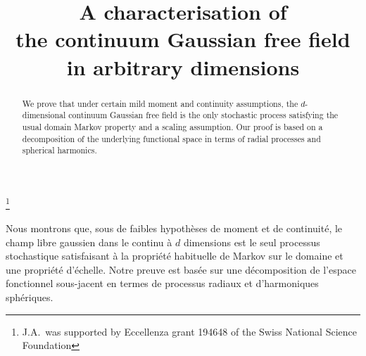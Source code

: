 \documentclass[JEP,XML,SOM,Unicode,published]{cedram}
\theoremstyle{definition}
\begin{document}
\frontmatter
\title[A characterisation of the continuum Gaussian free field in arbitrary dimensions]{A characterisation of\\ the continuum Gaussian free field\\ in arbitrary dimensions}

\author[\initial{J.} \lastname{Aru}]{ }
\address{Institute of Mathematics, École Polytechnique Fédérale de Lausanne\\
CH-1015 Lausanne, Switzerland}

\author[\initial{E.} \lastname{Powell}]{ }
\address{Department of Mathematical and Computing Sciences, Durham University\\
Upper Mountjoy Campus, Stockton Rd, Durham DH1 3LE, UK}

\thanks{J.A.\ was supported by Eccellenza grant 194648 of the Swiss National Science Foundation}

\begin{abstract}
We prove that under certain mild moment and continuity assumptions, the $d$\nobreakdash-dimensional continuum Gaussian free field is the only stochastic process satisfying the usual domain Markov property and a scaling assumption. Our proof is based on a decomposition of the underlying functional space in terms of radial processes and spherical harmonics.
\end{abstract}





\begin{altabstract}
Nous montrons que, sous de faibles hypothèses de moment et de continuité, le champ libre gaussien dans le continu à $d$ dimensions est le seul processus stochastique satisfaisant à la propriété habituelle de Markov sur le domaine et une propriété d'échelle. Notre preuve est basée sur une décomposition de l'espace fonctionnel sous-jacent en termes de processus radiaux et d'harmoniques sphériques.
\end{altabstract}
\maketitle
\vspace*{-\baselineskip}
\tableofcontents
\mainmatter
\vspace*{-2\baselineskip}
\mbox{}
\end{document}
